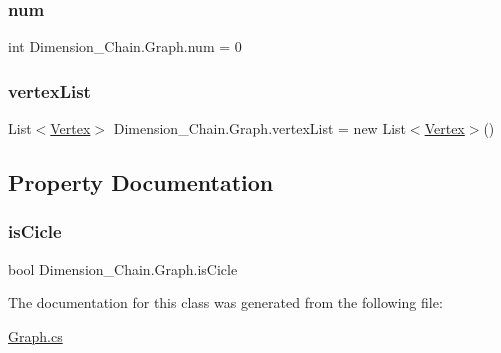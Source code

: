 \subsubsection{\texorpdfstring{num}{num}}
{\footnotesize\ttfamily int Dimension\+\_\+\+Chain.\+Graph.\+num = 0}

\mbox{\label{class_dimension___chain_1_1_graph_a74a6519101a76d81f7ad02c72915648a}} 
\subsubsection{\texorpdfstring{vertex\+List}{vertexList}}
{\footnotesize\ttfamily List$<$\mbox{\hyperlink{class_dimension___chain_1_1_vertex}{Vertex}}$>$ Dimension\+\_\+\+Chain.\+Graph.\+vertex\+List = new List$<$\mbox{\hyperlink{class_dimension___chain_1_1_vertex}{Vertex}}$>$()}



\subsection{Property Documentation}
\mbox{\label{class_dimension___chain_1_1_graph_a3b83aa20522a80c1e33ee1975a705278}} 
\subsubsection{\texorpdfstring{is\+Cicle}{isCicle}}
{\footnotesize\ttfamily bool Dimension\+\_\+\+Chain.\+Graph.\+is\+Cicle\hspace{0.3cm}{\ttfamily [get]}}



The documentation for this class was generated from the following file\+:\begin{DoxyCompactItemize}
\item 
\mbox{\hyperlink{_graph_8cs}{Graph.\+cs}}\end{DoxyCompactItemize}
